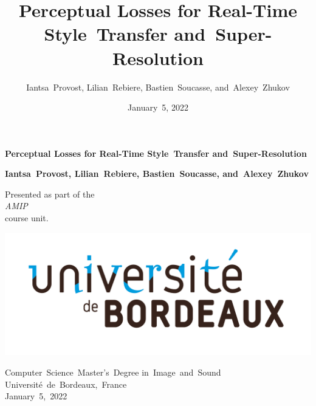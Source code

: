 \documentclass{article}
\title{Perceptual Losses for Real-Time Style~Transfer and~Super-Resolution}
\author{Iantsa~Provost, Lilian~Rebiere, Bastien~Soucasse, and~Alexey~Zhukov}
\date{January~5, 2022}
\begin{document}
{
    \begin{titlepage}
        \begin{center}
            \vspace*{1.5cm}

            \Large

            \textbf{Perceptual Losses for Real-Time Style~Transfer and~Super-Resolution}

            \vspace{.5cm}

            \vspace{1.5cm}

            \large

            \textbf{Iantsa~Provost, Lilian~Rebiere, Bastien~Soucasse, and~Alexey~Zhukov}

            \vfill

            \normalsize

            Presented as part of the\\
            \textit{AMIP}\\
            course unit.

            \vspace{1.5cm}

            \includegraphics[width=.5\textwidth]{images/college-logo.jpg}

            Computer~Science~Master's~Degree in~Image~and~Sound\\
            Université~de~Bordeaux,~France\\
            January~5,~2022
        \end{center}
    \end{titlepage}
    \newpage
    \setcounter{page}{2}
}

{
    \hypersetup{linkcolor=black}
    \tableofcontents
    \newpage
}
\end{document}
